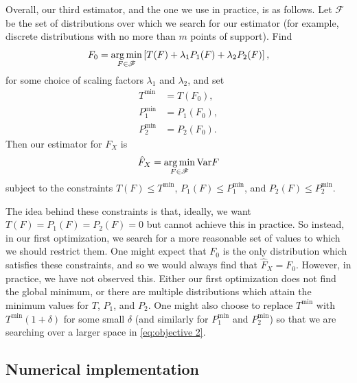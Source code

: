 	Overall, our third estimator, and the one we use in practice, is as follows. Let $\mathscr{F}$ be the set of distributions over which we search for our estimator (for example, discrete distributions with no more than $m$ points of support). Find
	\begin{equation}
		F_0 = \operatorname*{arg\,min}_{F \in \mathscr{F}} \left[T(F) + \lambda_1 P_1(F) + \lambda_2 P_2(F)\right],
		\label{eq:objective 1}
	\end{equation}
	for some choice of scaling factors $\lambda_1$ and $\lambda_2$, and set
	\begin{align}
		T^\mathrm{min} &= T(F_0),\\
		P_1^\mathrm{min} &= P_1(F_0),\\
		P_2^\mathrm{min} &= P_2(F_0).
	\end{align}
	Then our estimator for $F_X$ is
	\begin{equation}
		\hat{F}_X = \operatorname*{arg\,min}_{F \in \mathscr{F}} \mathrm{Var}{F}
		\label{eq:objective 2}
	\end{equation}
	subject to the constraints $T(F) \leq T^\mathrm{min}$, $P_1(F) \leq P_1^\mathrm{min}$, and $P_2(F) \leq P_2^\mathrm{min}$.

	The idea behind these constraints is that, ideally, we want $T(F) = P_1(F) = P_2(F) = 0$ but cannot achieve this in practice. So instead, in our first optimization, we search for a more reasonable set of values to which we should restrict them. One might expect that $F_0$ is the only distribution which satisfies these constraints, and so we would always find that $\hat{F}_X = F_0$. However, in practice, we have not observed this. Either our first optimization does not find the global minimum, or there are multiple distributions which attain the minimum values for $T$, $P_1$, and $P_2$. One might also choose to replace $T^\mathrm{min}$ with $T^\mathrm{min}(1 + \delta)$ for some small $\delta$ (and similarly for $P_1^\mathrm{min}$ and $P_2^\mathrm{min}$) so that we are searching over a larger space in \eqref{eq:objective 2}.
	
	

	

	\subsection{Numerical implementation}

